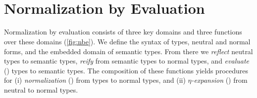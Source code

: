 \documentclass[sigplan,screen]{acmart}
\newif\ifNbE\NbEtrue
\begin{document}
\begin{code}[hide]%
\>[0]\AgdaSpace{}%
\AgdaSpace{}%
\<%
\\
\>[0][@{}l@{\AgdaIndent{0}}]%
\>[2]\AgdaSpace{}%
\AgdaSpace{}%
\AgdaSpace{}%
\AgdaSymbol{;}\AgdaSpace{}%
\AgdaSpace{}%
\AgdaSpace{}%
\AgdaSpace{}%
\AgdaSymbol{;}\AgdaSpace{}%
\AgdaSpace{}%
\AgdaSpace{}%
\<%
\end{code} 
\begin{code}%
%
\>[2]\AgdaSpace{}%
\AgdaSymbol{:}\AgdaSpace{}%
\AgdaSymbol{(}\AgdaSpace{}%
\AgdaSymbol{:}\AgdaSpace{}%
\AgdaSpace{}%
\AgdaSpace{}%
\AgdaSymbol{)}\AgdaSpace{}%
\AgdaSpace{}%
\AgdaSpace{}%
\AgdaOperator{\AgdaField{[}}\AgdaSpace{}%
\AgdaSpace{}%
\AgdaOperator{\AgdaField{]ₛ}}\AgdaSpace{}%
\AgdaSpace{}%
\<%
\end{code}
\begin{code}[hide]%
%
\>[2]\AgdaSpace{}%
\AgdaSpace{}%
\AgdaSpace{}%
\<%
\\
%
\>[2]\AgdaSpace{}%
\AgdaSymbol{=}\AgdaSpace{}%
\<%
\end{code}
\fi


\section{Normalization by Evaluation}
\label{sec:NbE}
\ifNbE




Normalization by evaluation  consists of three key domains and three functions over these domains (\cref{fig:nbe}). We define the syntax of types, neutral and normal forms, and the embedded domain of semantic types. From there we \emph{reflect} neutral types to semantic types, \emph{reify} from semantic types to normal types, and \emph{evaluate} () types to semantic types. The composition of these functions yields procedures for (i) \emph{normalization} () from types to normal types, and (ii) \emph{$\eta$-expansion} () from neutral to normal types.
\end{document}
